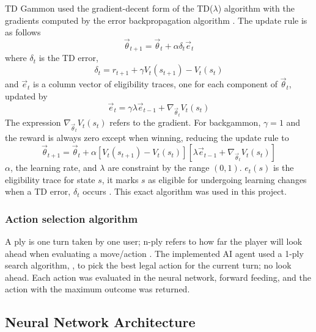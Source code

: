 \documentclass[12pt,a4paper]{article}
\begin{document}
TD Gammon used the gradient-decent form of the TD($\lambda$) algorithm with the gradients computed by the error backpropagation algorithm \cite{rl}. The update rule is as follows
$$\vec{\theta}_{t+1} = \vec{\theta}_{t} + \alpha\delta_t\vec{e}_{t}$$ 
where $\delta_t$ is the TD error,
$$\delta_{t} = r_{t+1} + \gamma V_t(s_{t+1}) - V_t(s_t)$$ 
and $\vec{e}_t$ is a column vector of eligibility traces, one for each component of $\vec{\theta}_t$, updated by 
$$\vec{e}_{t} = \gamma\lambda\vec{e}_{t-1} + \nabla_{\vec{\theta}_{t}}V_t(s_t)$$ 
The expression $\nabla_{\vec{\theta}_{t}}V_t(s_t)$ refers to the gradient. For backgammon, $\gamma=1$ and the reward is always zero except when winning, reducing the update rule to
$$\vec{\theta}_{t+1} = \vec{\theta}_{t} + \alpha[V_t(s_{t+1}) - V_t(s_t)][\lambda\vec{e}_{t-1} + \nabla_{\vec{\theta}_{t}}V_t(s_t)]$$
$\alpha$, the learning rate, and $\lambda$ are constraint by the range $(0,1)$. $e_t(s)$ is the eligibility trace for state $s$, it marks $s$ as eligible for undergoing learning changes when a TD error, $\delta_t$ occurs \cite{rl}. This exact algorithm was used in this project.

\subsubsection{Action selection algorithm}
A ply is one turn taken by one user; n-ply refers to how far the player will look ahead when evaluating a move/action \cite{glossary}. The implemented AI agent used a 1-ply search algorithm, \cite{DBLP:conf/icml/Tesauro92}, to pick the best legal action for the current turn; no look ahead. Each action was evaluated in the neural network, forward feeding, and the action with the maximum outcome was returned. 

\subsection{Neural Network Architecture}
\end{document}
